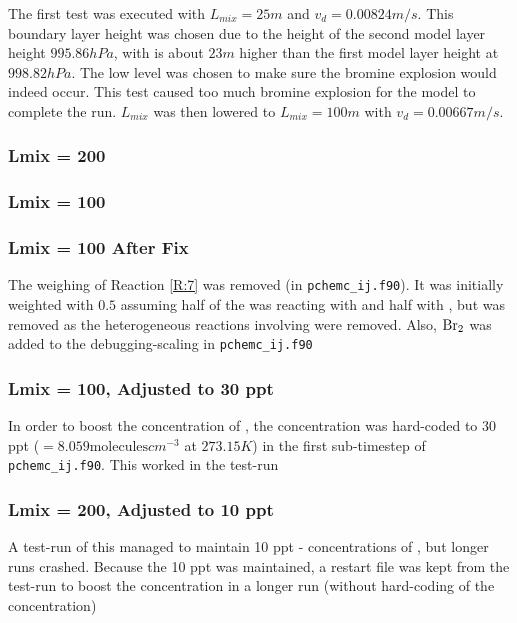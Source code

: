 \medskip

The first test was executed with $L_{mix} = 25 m$ and $v_d = 0.00824 m/s$. This boundary layer height was chosen due to the height of the second model layer height $995.86 hPa$, with is about $23 m$ higher than the first model layer height at $998.82 hPa$. The low level was chosen to make sure the bromine explosion would indeed occur. This test caused too much bromine explosion for the model to complete the run. $L_{mix}$ was then lowered to $L_{mix} = 100 m$ with $v_d = 0.00667 m/s$. 

\subsubsection{Lmix = 200}

\subsubsection{Lmix = 100}

\subsubsection{Lmix = 100 After Fix}

The weighing of Reaction \ref{R:7} was removed (in \texttt{pchemc\_ij.f90}). It was initially weighted with $0.5$ assuming half of the  was reacting with  and half with , but was removed as the heterogeneous reactions involving  were removed. Also, $\mathrm{Br_2}$ was added to the debugging-scaling in \texttt{pchemc\_ij.f90}

\subsubsection{Lmix = 100,  Adjusted to 30 ppt}

In order to boost the concentration of , the concentration was hard-coded to 30 ppt ($= 8.059 \text{molecules}cm^{-3}$ at $273.15 K$) in the first sub-timestep of \texttt{pchemc\_ij.f90}. This worked in the test-run


\subsubsection{Lmix = 200,  Adjusted to 10 ppt}

A test-run of this managed to maintain 10 ppt - concentrations of , but longer runs crashed. Because the 10 ppt was maintained, a restart file was kept from the test-run to boost the concentration in a longer run (without hard-coding of the  concentration)


